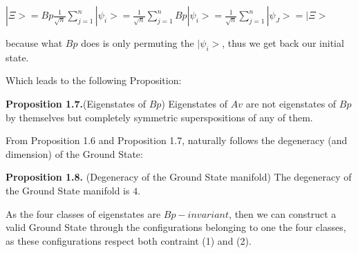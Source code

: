 \documentclass[12pt]{report}
\begin{document}
\begin{minipage}{1 \textwidth}
		\begin{center}
			$|\Xi>= Bp \frac{1}{\sqrt{n}} \sum_{j=1}^{n} |\psi_i> = \frac{1}{\sqrt{n}} \sum_{j=1}^{n} Bp |\psi_i> = \frac{1}{\sqrt{n}} \sum_{j=1}^{n} |\psi_J> =|\Xi>$
		\end{center}
		
		because what $Bp$ does is only permuting the $|\psi_i>$, thus we get back our initial state. \newline
		
		Which leads to the following Proposition:\newline
		
		\textbf{Proposition 1.7.}(Eigenstates of $Bp$) Eigenstates of $Av$ are not eigenstates of $Bp$ by themselves but completely symmetric superspositions of any of them.\newline
		
		From Proposition 1.6 and Proposition 1.7, naturally follows the degeneracy (and dimension) of the Ground State:\newline

		\textbf{Proposition 1.8.} (Degeneracy of the Ground State manifold) The degeneracy of the Ground State manifold is $4$. \newline
		
		As the four classes of eigenstates are $Bp-invariant$, then we can construct a valid Ground State through the configurations belonging to one the four classes, as these configurations respect both contraint (1) and (2).\newline
		
	\end{minipage}
















 
	
\end{document}
